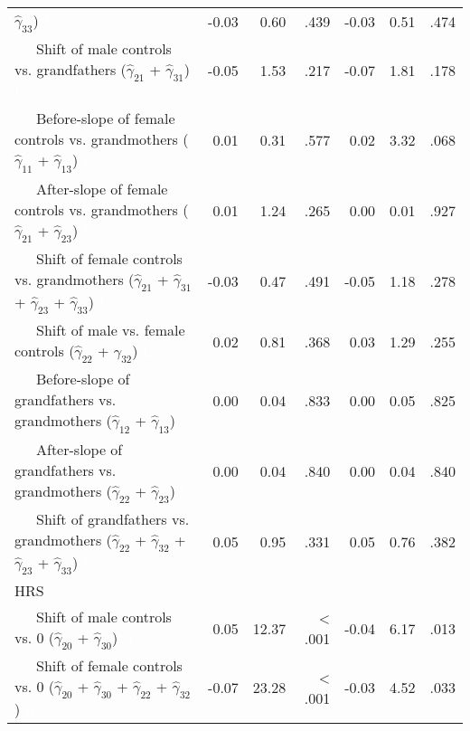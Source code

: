 \documentclass[
  english,
  man,floatsintext]{apa7}
\newenvironment{lltable}{\begin{landscape}\begin{center}\begin{ThreePartTable}}{\end{ThreePartTable}\end{center}\end{landscape}}
\begin{document}
\begin{lltable}
{\begin{longtable}{lrrrrrr}
                              $\hat{\gamma}_{33}$) \textcolor{white}{L} & -0.03 & 0.60 & .439 & -0.03 & 0.51 & .474\\
\ \ \ Shift of male controls vs. grandfathers 
                              ($\hat{\gamma}_{21}$ + $\hat{\gamma}_{31}$) \textcolor{white}{L} & -0.05 & 1.53 & .217 & -0.07 & 1.81 & .178\\
\ \ \ Before-slope of female controls vs. grandmothers 
                              ($\hat{\gamma}_{11}$ + $\hat{\gamma}_{13}$) \textcolor{white}{L} & 0.01 & 0.31 & .577 & 0.02 & 3.32 & .068\\
\ \ \ After-slope of female controls vs. grandmothers 
                              ($\hat{\gamma}_{21}$ + $\hat{\gamma}_{23}$) \textcolor{white}{L} & 0.01 & 1.24 & .265 & 0.00 & 0.01 & .927\\
\ \ \ Shift of female controls vs. grandmothers 
                              ($\hat{\gamma}_{21}$ + $\hat{\gamma}_{31}$ + 
                              $\hat{\gamma}_{23}$ + $\hat{\gamma}_{33}$) \textcolor{white}{L} & -0.03 & 0.47 & .491 & -0.05 & 1.18 & .278\\
\ \ \ Shift of male vs. female controls 
                              ($\hat{\gamma}_{22}$ + $\hat{\gamma}_{32}$) \textcolor{white}{L} & 0.02 & 0.81 & .368 & 0.03 & 1.29 & .255\\
\ \ \ Before-slope of grandfathers vs. grandmothers 
                              ($\hat{\gamma}_{12}$ + $\hat{\gamma}_{13}$) \textcolor{white}{L} & 0.00 & 0.04 & .833 & 0.00 & 0.05 & .825\\
\ \ \ After-slope of grandfathers vs. grandmothers 
                              ($\hat{\gamma}_{22}$ + $\hat{\gamma}_{23}$) \textcolor{white}{L} & 0.00 & 0.04 & .840 & 0.00 & 0.04 & .840\\
\ \ \ Shift of grandfathers vs. grandmothers 
                              ($\hat{\gamma}_{22}$ + $\hat{\gamma}_{32}$ + 
                              $\hat{\gamma}_{23}$ + $\hat{\gamma}_{33}$) \textcolor{white}{L} & 0.05 & 0.95 & .331 & 0.05 & 0.76 & .382\\
HRS &  &  &  &  &  & \\
\ \ \ Shift of male controls vs. 0 ($\hat{\gamma}_{20}$ + 
                              $\hat{\gamma}_{30}$) \textcolor{white}{H} & 0.05 & 12.37 & < .001 & -0.04 & 6.17 & .013\\
\ \ \ Shift of female controls vs. 0 ($\hat{\gamma}_{20}$ + 
                              $\hat{\gamma}_{30}$ + $\hat{\gamma}_{22}$ + 
                              $\hat{\gamma}_{32}$) \textcolor{white}{H} & -0.07 & 23.28 & < .001 & -0.03 & 4.52 & .033\\

\end{longtable}}
\end{lltable}
\end{document}
